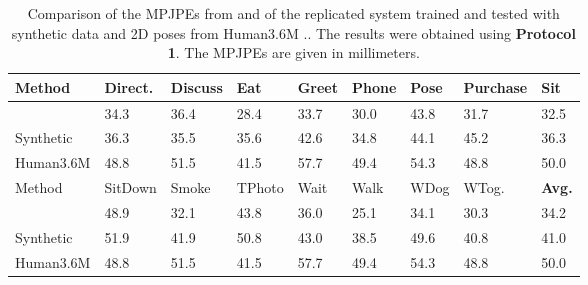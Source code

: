 \begin{table}[t]	
	\centering
	\begin{tabularx}{\textwidth}{l *{8}{Y}}
		\toprule
		Method & Direct. & Discuss & Eat & Greet & Phone & Pose & Purchase & Sit \\
		\midrule
		\citet{drover18} & 34.3 & 36.4 & 28.4 & 33.7 & 30.0 & 43.8 & 31.7 & 32.5\\
		Synthetic & 36.3 & 35.5 & 35.6 & 42.6 & 34.8 & 44.1 & 45.2 & 36.3 \\
		Human3.6M & 48.8 & 51.5 & 41.5 & 57.7 & 49.4 & 54.3 & 48.8 & 50.0 \\
		\bottomrule
		\toprule
		Method & SitDown & Smoke & TPhoto & Wait & Walk & WDog & WTog. & \textbf{Avg.}\\
		\midrule
		\citet{drover18} & 48.9 & 32.1 & 43.8 & 36.0 & 25.1 & 34.1 & 30.3 & 34.2\\
		Synthetic & 51.9 & 41.9 & 50.8 & 43.0 & 38.5 & 49.6 & 40.8 & 41.0 \\
		Human3.6M & 48.8 & 51.5 & 41.5 & 57.7 & 49.4 & 54.3 & 48.8 & 50.0 \\
		\bottomrule
	\end{tabularx}
	\caption{
		Comparison of the MPJPEs from \cite{drover18} and of the replicated system trained and tested with synthetic data and 2D poses from Human3.6M \cite{ionescu14}.. 
		The results were obtained using \textbf{Protocol 1}. The MPJPEs are given in millimeters.
	 }
	\label{tbl:results-original-protocol1}
\end{table}